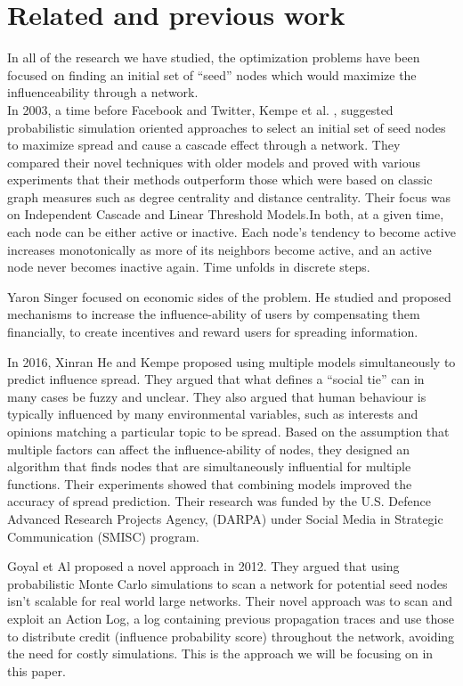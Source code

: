 \documentclass{acm_proc_article-sp}
\begin{document}
\section{Related and previous work}

In all of the research we have studied, the optimization problems have been focused on finding an initial set of “seed” nodes which would maximize the influenceability through a network. \\

In 2003, a time before Facebook and Twitter, Kempe et al. \cite{kempe:maxspread}, suggested probabilistic simulation oriented approaches to select an initial set of seed nodes to maximize spread and cause a cascade effect through a network. They compared their novel techniques with older models and proved with various experiments that their methods outperform those which were based on classic graph measures such as degree centrality and distance centrality. Their focus was on Independent Cascade and Linear Threshold Models.In both, at a given time, each node can be either active or inactive. Each node's tendency to become active increases monotonically as more of its neighbors become active, and an active node never becomes inactive again. Time unfolds in discrete steps.

Yaron Singer \cite{singer:winfriends} focused on economic sides of the problem. He studied and proposed mechanisms to increase the influence-ability of users by compensating them financially, to create incentives and reward users for spreading information.

In 2016, Xinran He and Kempe \cite{DBLP:journals/corr/HeK16} proposed using multiple models simultaneously to predict influence spread. They argued that what defines a “social tie” can in many cases be fuzzy and unclear. They also argued that human behaviour is typically influenced by many environmental variables, such as interests and opinions matching a particular topic to be spread. Based on the assumption that multiple factors can affect the influence-ability of nodes, they designed an algorithm that finds nodes that are simultaneously influential for multiple functions. Their experiments showed that combining models improved the accuracy of spread prediction. Their research was funded by the U.S. Defence Advanced Research Projects Agency, (DARPA) under Social Media in Strategic Communication (SMISC) program.


Goyal et Al \cite{goyal:datainfluence} proposed a novel approach in 2012. They argued that using probabilistic Monte Carlo simulations to scan a network for potential seed nodes isn't scalable for real world large networks. Their novel approach was to scan and exploit an Action Log, a log containing previous propagation traces and use those to distribute credit (influence probability score) throughout the network, avoiding the need for costly simulations. This is the approach we will be focusing on in this paper.
\end{document}
